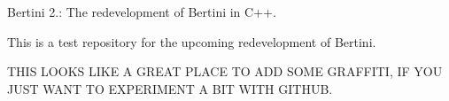 Bertini 2.\+: The redevelopment of Bertini in C++.

This is a test repository for the upcoming redevelopment of Bertini.

T\+H\+I\+S L\+O\+O\+K\+S L\+I\+K\+E A G\+R\+E\+A\+T P\+L\+A\+C\+E T\+O A\+D\+D S\+O\+M\+E G\+R\+A\+F\+F\+I\+T\+I, I\+F Y\+O\+U J\+U\+S\+T W\+A\+N\+T T\+O E\+X\+P\+E\+R\+I\+M\+E\+N\+T A B\+I\+T W\+I\+T\+H G\+I\+T\+H\+U\+B. 